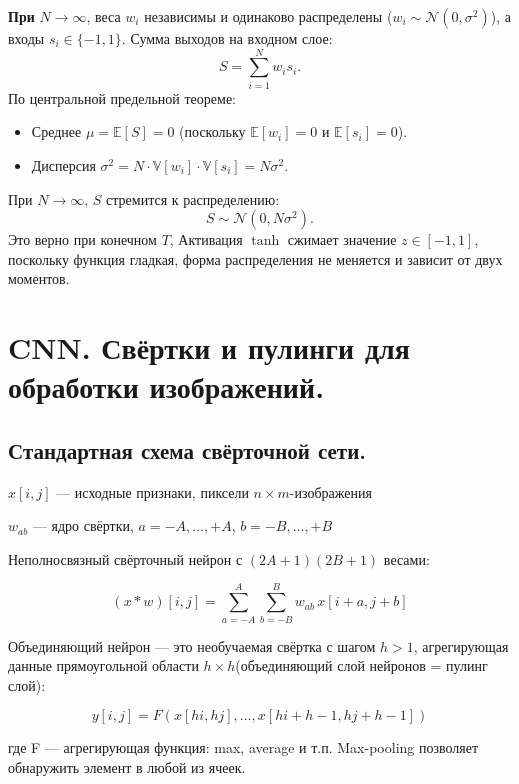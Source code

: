 \begin{description}
\textbf{При} \( N \to \infty \), веса \( w_i \) независимы и одинаково распределены (\( w_i \sim \mathcal{N}(0, \sigma^2) \)), а входы \( s_i \in \{-1, 1\} \).
Сумма выходов на входном слое:
\[
S = \sum_{i=1}^N w_i s_i.
\]
По центральной предельной теореме:
\begin{itemize}
    \item Среднее \( \mu = \mathbb{E}[S] = 0 \) (поскольку \( \mathbb{E}[w_i] = 0 \) и \( \mathbb{E}[s_i] = 0 \)).
    \item Дисперсия \( \sigma^2 = N \cdot \mathbb{V}[w_i] \cdot \mathbb{V}[s_i] = N \sigma^2 \).
\end{itemize}
При \( N \to \infty \), \( S \) стремится к распределению:
\[
S \sim \mathcal{N}(0, N \sigma^2).
\]
Это верно при конечном $T$, Активация 
$\tanh$ сжимает значение $z \in [-1, 1]$, поскольку функция гладкая, форма распределения не меняется и зависит от двух моментов.


\section{CNN. Свёртки и пулинги для обработки изображений.}
\subsection{Стандартная схема свёрточной сети.}

$ x[i, j] $ — исходные признаки, пиксели $ n \times m $-изображения

$ w_{ab} $ — ядро свёртки, $ a = -A, \ldots, +A $, $ b = -B, \ldots, +B $

Неполносвязный свёрточный нейрон с $ (2A + 1)(2B + 1) $ весами:

$$
(x * w)[i, j] = \sum_{a=-A}^{A} \sum_{b=-B}^{B} w_{ab} \, x[i + a, j + b]
$$

Объединяющий нейрон — это необучаемая свёртка с шагом $ h > 1 $, агрегирующая данные прямоугольной области $ h \times h $(объединяющий слой нейронов = пулинг слой):

$$
y[i, j] = F \left( x[hi, hj], \ldots, x[hi + h - 1, hj + h - 1] \right)
$$

где  F  — агрегирующая функция: max, average и т.п. Max-pooling позволяет обнаружить элемент в любой из ячеек.

\begin{figure}[h]


\end{figure}
\end{description}
